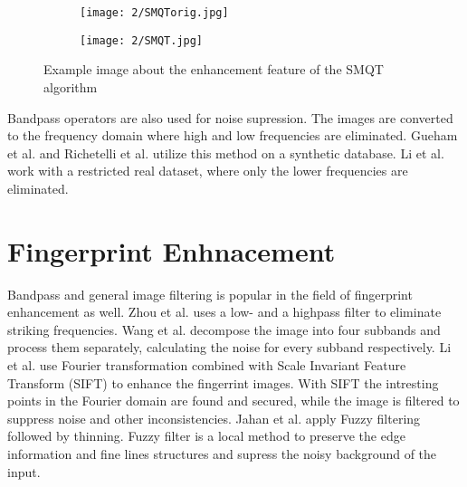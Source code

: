 \documentclass[draft,final]{vutinfth} %
\begin{document}
\begin{figure}[h]
  \centering
  \begin{subfigure}[b]{0.4\columnwidth}
    \centering
    \texttt{[image: 2/SMQTorig.jpg]}
    \label{fig:rw:SMQTin}
  \end{subfigure}
  \begin{subfigure}[b]{0.4\columnwidth}
    \centering
    \texttt{[image: 2/SMQT.jpg]}
    \label{fig:rw:SMQTout}
  \end{subfigure}
  \caption{Example image about the enhancement feature of the SMQT algorithm \cite{katireddy2017novel} }
  \label{fig:rw:SMQT} %
\end{figure}

\par
Bandpass operators are also used for noise supression.
The images are converted to the frequency domain where high and low frequencies are eliminated.
Gueham et al. \cite{gueham2007automatic} and Richetelli et al. \cite{richetelli2017classification} utilize this method on a synthetic database.
Li et al. \cite{li2014retrieval} work with a restricted real dataset, where only the lower frequencies are eliminated.

\section*{Fingerprint Enhnacement}

Bandpass and general image filtering is popular in the field of fingerprint enhancement as well.
Zhou et al. \cite{zhou2011adaptive} uses a low- and a highpass filter to eliminate striking frequencies. 
Wang et al. \cite{wang2014enhanced} decompose the image into four subbands and process them separately, calculating the noise for every subband respectively.
Li et al. \cite{li2012texture} use Fourier transformation combined with Scale Invariant Feature Transform (SIFT) to enhance the fingerrint images. 
With SIFT the intresting points in the Fourier domain are found and secured, while the image is filtered to suppress noise and other inconsistencies.
Jahan et al. \cite{jahan2017robust} apply Fuzzy filtering followed by thinning.
Fuzzy filter is a local method to preserve the edge information and fine lines structures and supress the noisy background of the input.
\end{document}
